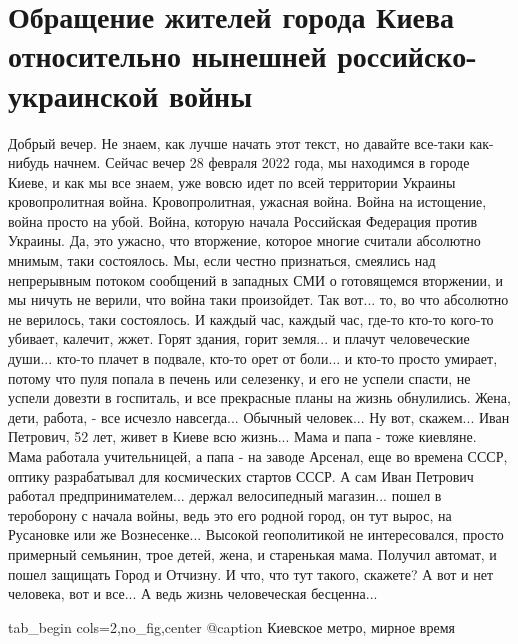  
 
 
 
 

\section{Обращение жителей города Киева относительно нынешней российско-украинской войны}

Добрый вечер. Не знаем, как лучше начать этот текст, но давайте все-таки
как-нибудь начнем. Сейчас вечер 28 февраля 2022 года, мы находимся в городе
Киеве, и как мы все знаем, уже вовсю идет по всей территории Украины
кровопролитная война. Кровопролитная, ужасная война. Война на истощение, война
просто на убой. Война, которую начала Российская Федерация против Украины. Да,
это ужасно, что вторжение, которое многие считали абсолютно мнимым, таки
состоялось. Мы, если честно признаться, смеялись над непрерывным потоком
сообщений в западных СМИ о готовящемся вторжении, и мы ничуть не верили, что
война таки произойдет. Так вот... то, во что абсолютно не верилось, таки
состоялось. И каждый час, каждый час, где-то кто-то кого-то убивает, калечит,
жжет. Горят здания, горит земля... и плачут человеческие души...  кто-то плачет
в подвале, кто-то орет от боли... и кто-то просто умирает, потому что пуля
попала в печень или селезенку, и его не успели спасти, не успели довезти в
госпиталь, и все прекрасные планы на жизнь обнулились. Жена, дети, работа, -
все исчезло навсегда... Обычный человек... Ну вот, скажем...  Иван Петрович, 52
лет, живет в Киеве всю жизнь... Мама и папа - тоже киевляне.  Мама работала
учительницей, а папа - на заводе Арсенал, еще во времена СССР, оптику
разрабатывал для космических стартов СССР.  А сам Иван Петрович работал
предпринимателем... держал велосипедный магазин... пошел в тероборону с начала
войны, ведь это его родной город, он тут вырос, на Русановке или же
Вознесенке... Высокой геополитикой не интересовался, просто примерный семьянин,
трое детей, жена, и старенькая мама.  Получил автомат, и пошел защищать Город и
Отчизну. И что, что тут такого, скажете? А вот и нет человека, вот и все... А
ведь жизнь человеческая бесценна...

\ifcmt
  tab_begin cols=2,no_fig,center
		 @caption Киевское метро, мирное время

